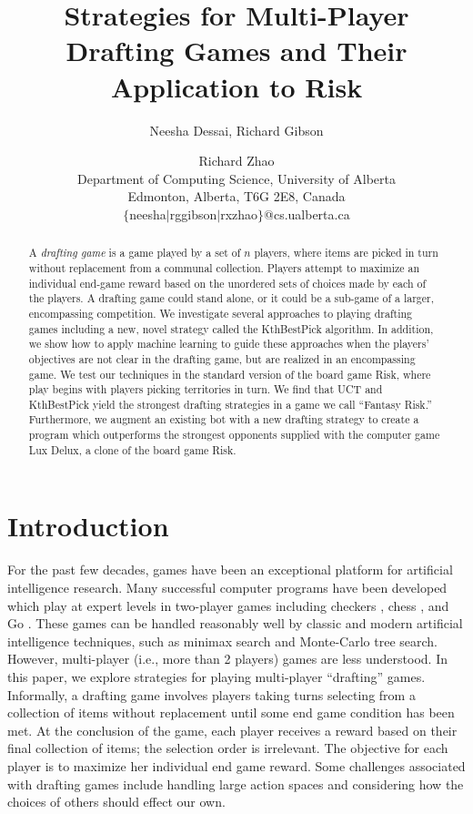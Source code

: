 \documentclass[letterpaper]{article}
\title{Strategies for Multi-Player Drafting Games and Their Application to Risk}
\author{Neesha Dessai, Richard Gibson \and Richard Zhao \\
Department of Computing Science, University of Alberta \\
Edmonton, Alberta, T6G 2E8, Canada \\
$\{$neesha$\mid$rggibson$\mid$rxzhao$\}$@cs.ualberta.ca}
\numberwithin{equation}{section}
\numberwithin{theorem}{section}
\numberwithin{lemma}{section}
\numberwithin{df}{section}
\begin{document}
\maketitle

\begin{abstract}
A \emph{drafting game} is a game played by a set of $n$ players, where items are picked in turn without replacement from a communal collection.  Players attempt to maximize an individual end-game reward based on the unordered sets of choices made by each of the players.  A drafting game could stand alone, or it could be a sub-game of a larger, encompassing competition.  We investigate several approaches to playing drafting games including a new, novel strategy called the KthBestPick algorithm.  In addition, we show how to apply machine learning to guide these approaches when the players' objectives are not clear in the drafting game, but are realized in an encompassing game.  We test our techniques in the standard version of the board game Risk, where play begins with players picking territories in turn.  We find that UCT and KthBestPick yield the strongest drafting strategies in a game we call ``Fantasy Risk.''  Furthermore, we augment an existing bot with a new drafting strategy to create a program which outperforms the strongest opponents supplied with the computer game Lux Delux, a clone of the board game Risk.
\end{abstract}

\section{Introduction}


For the past few decades, games have been an exceptional platform for artificial intelligence research.  Many successful computer programs have been developed which play at expert levels in two-player games including %
checkers \cite{Chinook}, chess \cite{DeepBlue}, 
and Go \cite{ComputerGo}.  These games can be handled reasonably well by classic and modern artificial intelligence techniques, such as minimax search and Monte-Carlo tree search.  However, multi-player (i.e., more than 2 players) games are less understood.  In this paper, we explore strategies for playing multi-player ``drafting'' games.  Informally, a drafting game involves players taking turns selecting from a collection of items without replacement until some end game condition has been met.  At the conclusion of the game, each player receives a reward based on their final collection of items; the selection order is irrelevant.  The objective for each player is to maximize her individual end game reward.  Some challenges associated with drafting games include handling large action spaces and considering how the choices of others should effect our own.
\end{document}
